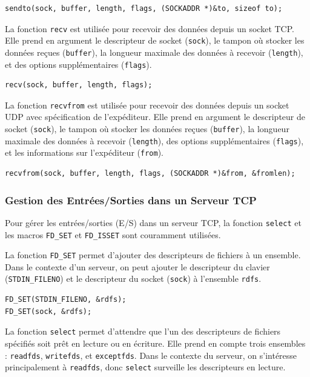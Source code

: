 \documentclass{article}
\begin{document}
\begin{verbatim}
sendto(sock, buffer, length, flags, (SOCKADDR *)&to, sizeof to);
\end{verbatim}

La fonction \texttt{recv} est utilisée pour recevoir des données depuis un socket TCP. Elle prend en argument le descripteur de socket (\texttt{sock}), le tampon où stocker les données reçues (\texttt{buffer}), la longueur maximale des données à recevoir (\texttt{length}), et des options supplémentaires (\texttt{flags}).

\begin{verbatim}
recv(sock, buffer, length, flags);
\end{verbatim}

La fonction \texttt{recvfrom} est utilisée pour recevoir des données depuis un socket UDP avec spécification de l'expéditeur. Elle prend en argument le descripteur de socket (\texttt{sock}), le tampon où stocker les données reçues (\texttt{buffer}), la longueur maximale des données à recevoir (\texttt{length}), des options supplémentaires (\texttt{flags}), et les informations sur l'expéditeur (\texttt{from}).

\begin{verbatim}
recvfrom(sock, buffer, length, flags, (SOCKADDR *)&from, &fromlen);
\end{verbatim}


\subsubsection{Gestion des Entrées/Sorties dans un Serveur TCP}

Pour gérer les entrées/sorties (E/S) dans un serveur TCP, la fonction \texttt{select} et les macros \texttt{FD_SET} et \texttt{FD_ISSET} sont couramment utilisées.

La fonction \texttt{FD_SET} permet d'ajouter des descripteurs de fichiers à un ensemble. Dans le contexte d'un serveur, on peut ajouter le descripteur du clavier (\texttt{STDIN_FILENO}) et le descripteur du socket (\texttt{sock}) à l'ensemble \texttt{rdfs}.

\begin{verbatim}
FD_SET(STDIN_FILENO, &rdfs);
FD_SET(sock, &rdfs);
\end{verbatim}

La fonction \texttt{select} permet d'attendre que l'un des descripteurs de fichiers spécifiés soit prêt en lecture ou en écriture. Elle prend en compte trois ensembles : \texttt{readfds}, \texttt{writefds}, et \texttt{exceptfds}. Dans le contexte du serveur, on s'intéresse principalement à \texttt{readfds}, donc \texttt{select} surveille les descripteurs en lecture.
\end{document}
